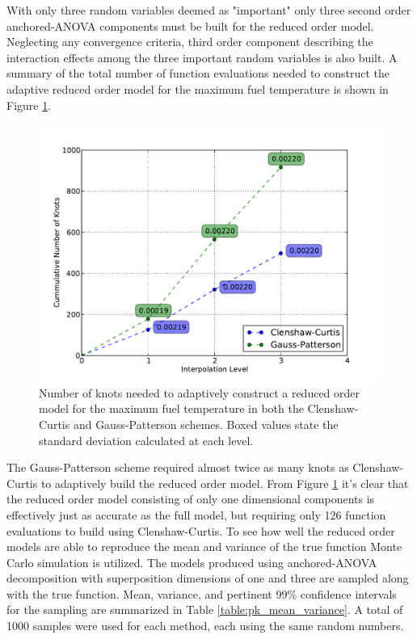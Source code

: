 With only three random variables deemed as "important" only three second order anchored-\ac{ANOVA} components must be built for the reduced order model. Neglecting any convergence criteria, third order component describing the interaction effects among the three important random variables is also built. A summary of the total number of function evaluations needed to construct the adaptive reduced order model for the maximum fuel temperature is shown in Figure \ref{fig:pk_sparse_grid_numknots}.          
\begin{figure}[!htb]
\caption{\label{fig:pk_sparse_grid_numknots}
Number of knots needed to adaptively construct a reduced order model for the maximum fuel temperature in both the Clenshaw-Curtis and Gauss-Patterson schemes. Boxed values state the standard deviation calculated at each level.  
}
 \begin{center}
  \includegraphics[scale=.75]{./Chapter3/pk_sparse_grid_numknots.pdf}
 \end{center}
\end{figure}
The Gauss-Patterson scheme required almost twice as many knots as Clenshaw-Curtis to adaptively build the reduced order model. From Figure \ref{fig:pk_sparse_grid_numknots} it's clear that the reduced order model consisting of only one dimensional components is effectively just as accurate as the full model, but requiring only 126 function evaluations to build using Clenshaw-Curtis. To see how well the reduced order models are able to reproduce the mean and variance of the true function Monte Carlo simulation is utilized. The models produced using anchored-\ac{ANOVA} decomposition with superposition dimensions of one and three are sampled along with the true function. Mean, variance, and pertinent 99\% confidence intervals for the sampling are summarized in Table \ref{table:pk_mean_variance}. A total of 1000 samples were used for each method, each using the same random numbers.      
